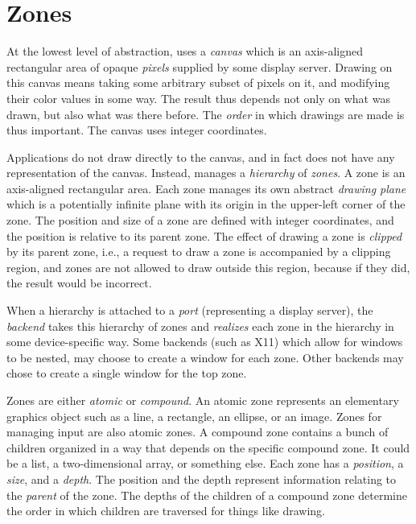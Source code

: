 \chapter{Zones}

At the lowest level of abstraction, \clim{} uses a \emph{canvas} which
is an axis-aligned rectangular area of opaque \emph{pixels} supplied
by some display server.  Drawing on this canvas means taking some
arbitrary subset of pixels on it, and modifying their color values in
some way.  The result thus depends not only on what was drawn, but
also what was there before.  The \emph{order} in which drawings are
made is thus important.  The canvas uses integer coordinates.

Applications do not draw directly to the canvas, and in fact \clim{}
does not have any representation of the canvas.  Instead,
\clim{} manages a \emph{hierarchy} of \emph{zones}.  A zone is an
axis-aligned rectangular area.  Each zone manages its own abstract
\emph{drawing plane} which is a potentially infinite plane with its
origin in the upper-left corner of the zone.  The position and size
of a zone are defined with integer coordinates, and the position is
relative to its parent zone.  The effect of drawing a zone is
\emph{clipped} by its parent zone, i.e., a request to draw a zone
is accompanied by a clipping region, and zones are not allowed to
draw outside this region, because if they did, the result would be
incorrect. 

When a hierarchy is attached to a \emph{port} (representing a display
server), the \emph{backend} takes this hierarchy of zones and
\emph{realizes} each zone in the hierarchy in some device-specific
way.  Some backends (such as X11) which allow for windows to be
nested, may choose to create a window for each zone.  Other backends
may chose to create a single window for the top zone.

Zones are either \emph{atomic} or \emph{compound}.  An atomic zone
represents an elementary graphics object such as a line, a rectangle,
an ellipse, or an image.  Zones for managing input are also atomic
zones.  A compound zone contains a bunch of children organized in a
way that depends on the specific compound zone.  It could be a \cl{}
list, a \cl{} two-dimensional array, or something else.  Each zone has
a \emph{position}, a \emph{size}, and a \emph{depth}.  The position
and the depth represent information relating to the \emph{parent} of
the zone.  The depths of the children of a compound zone determine the
order in which children are traversed for things like drawing.

